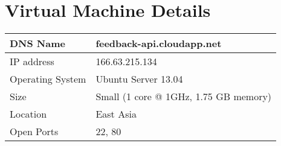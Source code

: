 
\section{Virtual Machine Details}
\begin{center}
\begin{tabular}{|l||p{7cm}|}

\hline
DNS Name         & feedback-api.cloudapp.net             \\
\hline
IP address       & 166.63.215.134                        \\
\hline
Operating System & Ubuntu Server 13.04                   \\
\hline
Size             & Small (1 core @ 1GHz, 1.75 GB memory) \\
\hline
Location         & East Asia                             \\
\hline
Open Ports       & 22, 80                                \\
\hline

\end{tabular}
\end{center}
